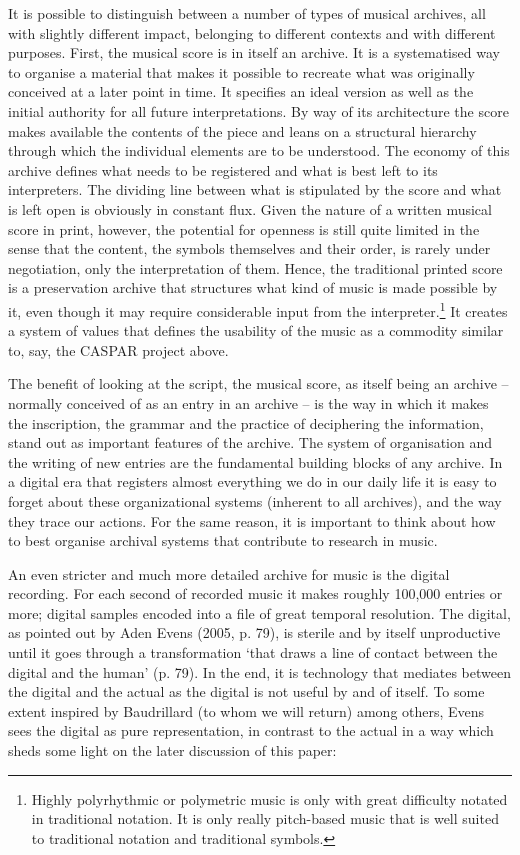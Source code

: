It is possible to distinguish between a number of types of musical
archives, all with slightly different impact, belonging to different
contexts and with different purposes. First, the musical score is in
itself an archive. It is a systematised way to organise a material that
makes it possible to recreate what was originally conceived at a later
point in time. It specifies an ideal version as well as the initial
authority for all future interpretations. By way of its architecture the
score makes available the contents of the piece and leans on a
structural hierarchy through which the individual elements are to be
understood. The economy of this archive defines what needs to be
registered and what is best left to its interpreters. The dividing line
between what is stipulated by the score and what is left open is
obviously in constant flux. Given the nature of a written musical score
in print, however, the potential for openness is still quite limited in
the sense that the content, the symbols themselves and their order, is
rarely under negotiation, only the interpretation of them. Hence, the
traditional printed score is a preservation archive that structures what
kind of music is made possible by it, even though it may require
considerable input from the interpreter.\footnote{Highly polyrhythmic or
  polymetric music is only with great difficulty notated in traditional
  notation. It is only really pitch-based music that is well suited to
  traditional notation and traditional symbols.} It creates a system of
values that defines the usability of the music as a commodity similar
to, say, the CASPAR project above.

The benefit of looking at the script, the musical score, as itself being
an archive -- normally conceived of as an entry in an archive -- is the
way in which it makes the inscription, the grammar and the practice of
deciphering the information, stand out as important features of the
archive. The system of organisation and the writing of new entries are
the fundamental building blocks of any archive. In a digital era that
registers almost everything we do in our daily life it is easy to forget
about these organizational systems (inherent to all archives), and the
way they trace our actions. For the same reason, it is important to
think about how to best organise archival systems that contribute to
research in music.

An even stricter and much more detailed archive for music is the digital
recording. For each second of recorded music it makes roughly 100,000
entries or more; digital samples encoded into a file of great temporal
resolution. The digital, as pointed out by Aden Evens (2005, p. 79), is
sterile and by itself unproductive until it goes through a
transformation `that draws a line of contact between the digital and the
human' (p. 79). In the end, it is technology that mediates between the
digital and the actual as the digital is not useful by and of itself. To
some extent inspired by Baudrillard (to whom we will return) among
others, Evens sees the digital as pure representation, in contrast to
the actual in a way which sheds some light on the later discussion of
this paper:

